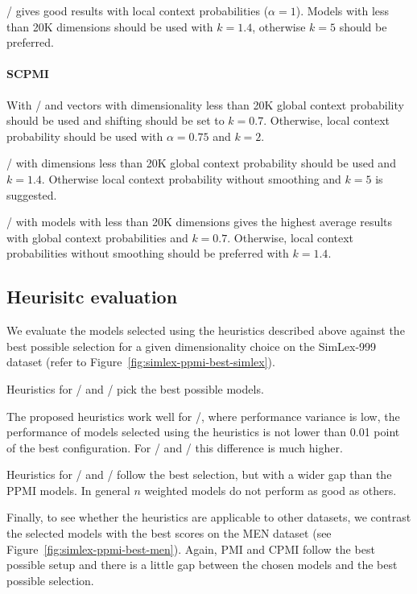 \documentclass[11pt,letterpaper]{article}
\begin{document}
\NSPMI/ gives good results with local context probabilities ($\alpha = 1$). Models with less than 20K dimensions should be used with $k = 1.4$, otherwise $k = 5$ should be preferred.

\paragraph{SCPMI}

With \SCPMI/ and vectors with dimensionality less than 20K global context probability should be used and shifting should be set to $k = 0.7$. Otherwise, local context probability should be used with $\alpha = 0.75$ and $k = 2$.

\NSCPMI/ with dimensions less than 20K global context probability should be used and $k = 1.4$. Otherwise local context probability without smoothing and $k = 5$ is suggested.

\logNSCPMI/ with models with less than 20K dimensions gives the highest average results with global context probabilities and $k = 0.7$. Otherwise, local context probabilities without smoothing should be preferred with $k = 1.4$.


\subsection{Heurisitc evaluation}
\label{sec:heurisitc-evaluation}

We evaluate the models selected using the heuristics described above against the best possible selection for a given dimensionality choice on the SimLex-999 dataset (refer to Figure~\ref{fig:simlex-ppmi-best-simlex}).

Heuristics for \logNPMI/ and \logNCPMI/ pick the best possible models.

The proposed heuristics work well for \logNSPMI/, where performance variance is low, the performance of models selected using the heuristics is not lower than 0.01 point of the best configuration. For \SPMI/ and \NSPMI/ this difference is much higher.

Heuristics for \logNCPMI/ and \CPMI/ follow the best selection, but with a wider gap than the PPMI models. In general $n$ weighted models do not perform as good as others.

Finally, to see whether the heuristics are applicable to other datasets, we contrast the selected models with the best scores on the MEN dataset (see Figure~\ref{fig:simlex-ppmi-best-men}). Again, PMI and CPMI follow the best possible setup and there is a little gap between the chosen models and the best possible selection.
\end{document}

